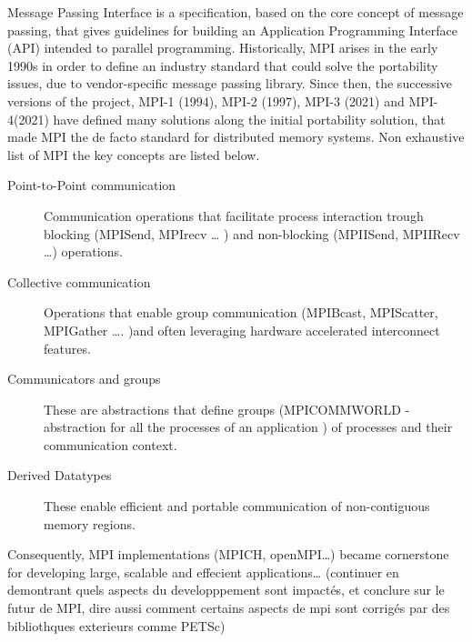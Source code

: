 Message Passing Interface is a specification, based on the core concept of message passing, that gives guidelines for building an Application Programming Interface (API) intended to parallel programming. Historically, MPI arises in the early 1990s in order to define an industry standard that could solve the portability issues, due to vendor-specific message passing library.  Since then, the successive versions of the project, MPI-1 (1994), MPI-2 (1997), MPI-3 (2021) and MPI-4(2021) have defined many solutions along the initial portability solution, that made MPI the de facto standard for distributed memory systems. Non exhaustive list of MPI the key concepts are listed below.


\begin{description}

\item[Point-to-Point communication]  Communication operations that facilitate process interaction trough blocking (MPISend, MPIrecv … ) and non-blocking (MPIISend, MPIIRecv …)  operations.

\item[Collective communication] Operations that enable group communication (MPIBcast, MPIScatter, MPIGather …. )and often leveraging hardware accelerated interconnect features.

\item[Communicators and groups] These are abstractions that define groups (MPICOMMWORLD - abstraction for all the processes of an application ) of  processes and their communication context.

\item[Derived Datatypes] These enable efficient and portable communication of non-contiguous memory regions.

\end{description}

Consequently, MPI implementations (MPICH, openMPI…) became cornerstone for developing large, scalable and effecient applications… (continuer en demontrant quels aspects du developppement sont impactés, et conclure sur le futur de MPI, dire aussi comment certains aspects de mpi sont corrigés par des bibliothques exterieurs comme PETSc)






